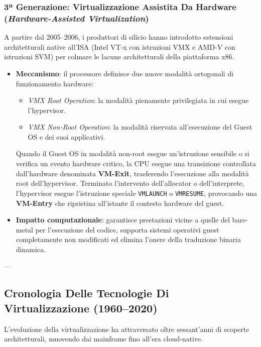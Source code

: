 \documentclass[11pt, a4paper]{article}
\begin{document}
\subsubsection{3ª Generazione: Virtualizzazione Assistita Da Hardware (\emph{Hardware-Assisted Virtualization})}
A partire dal 2005--2006, i produttori di silicio hanno introdotto estensioni architetturali native all'ISA (Intel VT-x con istruzioni VMX e AMD-V con istruzioni SVM) per colmare le lacune architetturali della piattaforma x86.
\begin{itemize}
    \item \textbf{Meccanismo}: il processore definisce due nuove modalità ortogonali di funzionamento hardware:
    \begin{itemize}
        \item \emph{VMX Root Operation}: la modalità pienamente privilegiata in cui esegue l'hypervisor.
        \item \emph{VMX Non-Root Operation}: la modalità riservata all'esecuzione del Guest OS e dei suoi applicativi.
    \end{itemize}
    Quando il Guest OS in modalità non-root esegue un'istruzione sensibile o si verifica un evento hardware critico, la CPU esegue una transizione controllata dall'hardware denominata \textbf{VM-Exit}, trasferendo l'esecuzione alla modalità root dell'hypervisor. Terminato l'intervento dell'allocator o dell'interprete, l'hypervisor esegue l'istruzione speciale \texttt{VMLAUNCH} o \texttt{VMRESUME}, provocando una \textbf{VM-Entry} che ripristina all'istante il contesto hardware del guest.
    \item \textbf{Impatto computazionale}: garantisce prestazioni vicine a quelle del bare-metal per l'esecuzione del codice, supporta sistemi operativi guest completamente non modificati ed elimina l'onere della traduzione binaria dinamica.
\end{itemize}

---

\subsection{Cronologia Delle Tecnologie Di Virtualizzazione (1960–2020)}

L'evoluzione della virtualizzazione ha attraversato oltre sessant'anni di scoperte architetturali, muovendo dai mainframe fino all'era cloud-native.

\end{document}
